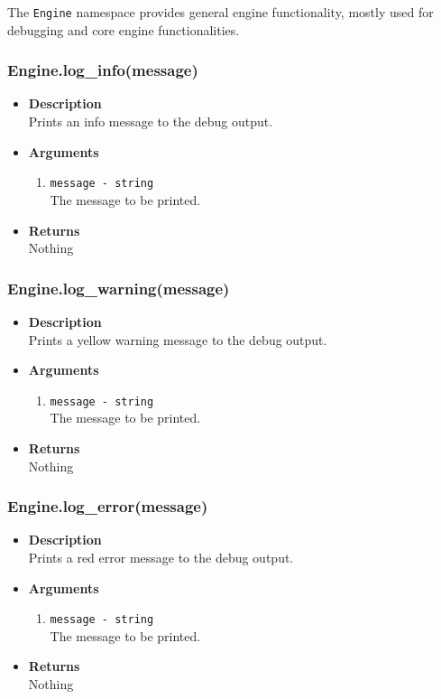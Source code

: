 \documentclass[12pt,a4paper]{article}
\begin{document}
The \texttt{Engine} namespace provides general engine functionality, mostly used for debugging and core engine functionalities.


\subsubsection{Engine.log\_info(message)}\label{EngineLogInfo}
\begin{itemize}
	\item[]{\bf Description}
		\\ Prints an info message to the debug output.
	\item[]{\bf Arguments}
	\begin{enumerate}
		\item{\texttt{message - string}} 
			\\ The message to be printed.
	\end{enumerate}
	\item[]{\bf Returns}
		\\ Nothing
\end{itemize}

\subsubsection{Engine.log\_warning(message)}\label{EngineLogWarning}
\begin{itemize}
	\item[]{\bf Description}
		\\ Prints a yellow warning message to the debug output.
	\item[]{\bf Arguments}
	\begin{enumerate}
		\item{\texttt{message - string}} 
			\\ The message to be printed.
	\end{enumerate}
	\item[]{\bf Returns}
		\\ Nothing
\end{itemize}

\subsubsection{Engine.log\_error(message)}\label{EngineLogError}
\begin{itemize}
	\item[]{\bf Description}
		\\ Prints a red error message to the debug output.
	\item[]{\bf Arguments}
	\begin{enumerate}
		\item{\texttt{message - string}} 
			\\ The message to be printed.
	\end{enumerate}
	\item[]{\bf Returns}
		\\ Nothing
\end{itemize}
\end{document}
